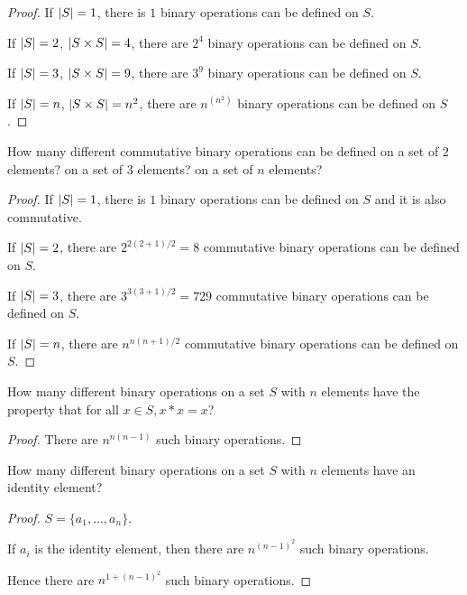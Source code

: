 \begin{proof}
    If $\left\vert{S}\right\vert = 1$, there is $1$ binary operations can be defined on $S$.

    If $\left\vert{S}\right\vert = 2$, $\left\vert{S\times S}\right\vert = 4$, there are $2^{4}$ binary operations can be defined on $S$.

    If $\left\vert{S}\right\vert = 3$, $\left\vert{S\times S}\right\vert = 9$, there are $3^{9}$ binary operations can be defined on $S$.

    If $\left\vert{S}\right\vert = n$, $\left\vert{S\times S}\right\vert = n^{2}$, there are $n^{(n^{2})}$ binary operations can be defined on $S$.
\end{proof}

\begin{exercise}
    How many different commutative binary operations can be defined on a set of $2$ elements? on a set of $3$ elements? on a set of $n$ elements?
\end{exercise}

\begin{proof}
    If $\left\vert{S}\right\vert = 1$, there is $1$ binary operations can be defined on $S$ and it is also commutative.

    If $\left\vert{S}\right\vert = 2$, there are $2^{2(2+1)/2} = 8$ commutative binary operations can be defined on $S$.

    If $\left\vert{S}\right\vert = 3$, there are $3^{3(3+1)/2} = 729$ commutative binary operations can be defined on $S$.

    If $\left\vert{S}\right\vert = n$, there are $n^{n(n+1)/2}$ commutative binary operations can be defined on $S$.
\end{proof}

\begin{exercise}
    How many different binary operations on a set $S$ with $n$ elements have the property that for all $x\in S, x * x = x$?
\end{exercise}

\begin{proof}
    There are $n^{n(n-1)}$ such binary operations.
\end{proof}

\begin{exercise}
    How many different binary operations on a set $S$ with $n$ elements have an identity element?
\end{exercise}

\begin{proof}
    $S = \{ a_{1}, \ldots, a_{n} \}$.

    If $a_{i}$ is the identity element, then there are $n^{{(n-1)}^{2}}$ such binary operations.

    Hence there are $n^{1 + {(n-1)}^{2}}$ such binary operations.
\end{proof}


